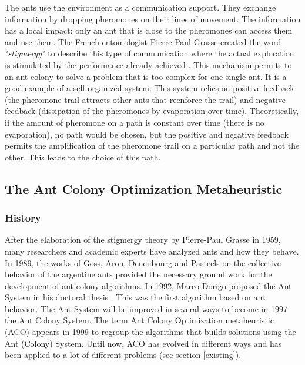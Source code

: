 The ants use the environment as a communication support. They exchange information by dropping pheromones on their lines of movement. The information has a local impact: only an ant that is close to the pheromones can access them and use them. The French entomologist Pierre-Paul Grasse created the word \textit{"stigmergy"} to describe this type of communication where the actual exploration is stimulated by the performance already achieved \cite{dorigo2006ant}. 
This mechanism permits to an ant colony to solve a problem that is too complex for one single ant. It is a good example of a self-organized system. This system relies on positive feedback (the pheromone trail attracts other ants that reenforce the trail) and negative feedback (dissipation of the pheromones by evaporation over time).
Theoretically, if the amount of pheromone on a path is constant over time (there is no evaporation), no path would be chosen, but the positive and negative feedback permits the amplification of the pheromone trail on a particular path and not the other. This leads to the choice of this path.

\subsection{The Ant Colony Optimization Metaheuristic}\label{metaheuristic}

\subsubsection{History}
After the elaboration of the stigmergy theory by Pierre-Paul Grasse in 1959, many researchers and academic experts have analyzed ants and how they behave. In 1989, the works of Goss, Aron, Deneubourg and Pasteels on the collective behavior of the argentine ants provided the necessary ground work for the development of ant colony algorithms. In 1992, Marco Dorigo proposed the Ant System in his doctoral thesis \cite{dorigo1991ant}. This was the first algorithm based on ant behavior. The Ant System will be improved in several ways to become in 1997 the Ant Colony System. The term Ant Colony Optimization metaheuristic (ACO) appears in 1999 to regroup the algorithms that builds solutions using the Ant (Colony) System. Until now, ACO has evolved in different ways and has been applied to a lot of different problems (see section \ref{existing}).

